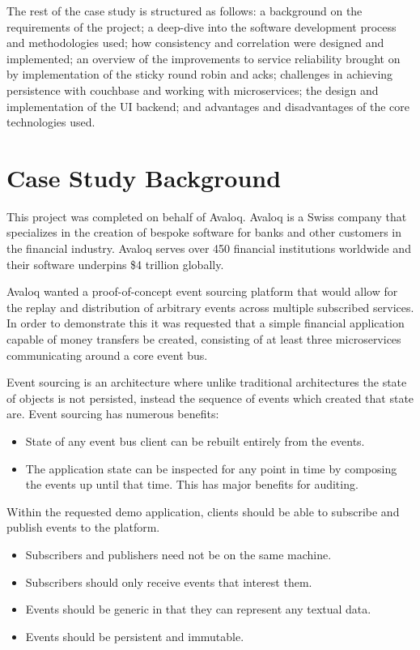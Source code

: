 \documentclass{l3proj}
\begin{document}
The rest of the case study is structured as follows: a background on the requirements of the project; a deep-dive into the software development process and methodologies used; how consistency and correlation were designed and implemented; an overview of the improvements to service reliability brought on by implementation of the sticky round robin and acks; challenges in achieving persistence with couchbase and working with microservices; the design and implementation of the UI backend; and advantages and disadvantages of the core technologies used.

\section{Case Study Background}
\label{sec:background}
This project was completed on behalf of Avaloq. Avaloq is a Swiss company that specializes in the creation of bespoke software for banks and other customers in the financial industry. Avaloq serves over 450 financial institutions worldwide and their software underpins \$4 trillion globally.

Avaloq wanted a proof-of-concept event sourcing platform that would allow for the replay and distribution of arbitrary events across multiple subscribed services. In order to demonstrate this it was requested that a simple financial application capable of money transfers be created, consisting of at least three microservices communicating around a core event bus.

Event sourcing is an architecture where unlike traditional architectures the state of objects is not persisted, instead the sequence of events which created that state are. Event sourcing has numerous benefits:

\begin{itemize}
    \item State of any event bus client can be rebuilt entirely from the events.
    \item The application state can be inspected for any point in time by composing the events up until that time. This has major benefits for auditing.
\end{itemize}


Within the requested demo application, clients should be able to subscribe and publish events to the platform.

\begin{itemize}
    \item Subscribers and publishers need not be on the same machine.
    \item Subscribers should only receive events that interest them.
    \item Events should be generic in that they can represent any textual data.
    \item Events should be persistent and immutable.
\end{itemize}
\end{document}

